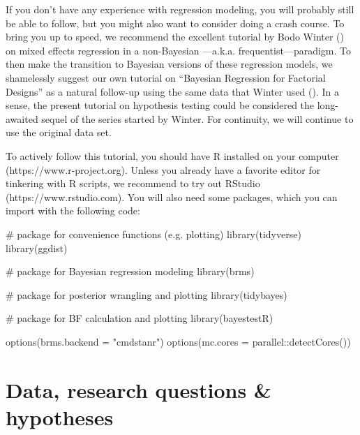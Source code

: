\documentclass[
  doc,
  floatsintext,
  longtable,
  nolmodern,
  notxfonts,
  notimes,
  colorlinks=true,linkcolor=blue,citecolor=blue,urlcolor=blue]{apa7}
\newenvironment{Shaded}{\begin{snugshade}}{\end{snugshade}}
\newcommand{\AttributeTok}[1]{\textcolor[rgb]{0.40,0.45,0.13}{#1}}
\newcommand{\CommentTok}[1]{\textcolor[rgb]{0.37,0.37,0.37}{#1}}
\newcommand{\FunctionTok}[1]{\textcolor[rgb]{0.28,0.35,0.67}{#1}}
\newcommand{\NormalTok}[1]{\textcolor[rgb]{0.00,0.23,0.31}{#1}}
\newcommand{\SpecialCharTok}[1]{\textcolor[rgb]{0.37,0.37,0.37}{#1}}
\newcommand{\StringTok}[1]{\textcolor[rgb]{0.13,0.47,0.30}{#1}}
\begin{document}
If you don't have any experience with regression modeling, you will
probably still be able to follow, but you might also want to consider
doing a crash course. To bring you up to speed, we recommend the
excellent tutorial by Bodo Winter
() on mixed eﬀects
regression in a non-Bayesian ---a.k.a. frequentist---paradigm. To then
make the transition to Bayesian versions of these regression models, we
shamelessly suggest our own tutorial on ``Bayesian Regression for
Factorial Designs'' as a natural follow-up using the same data that
Winter used
(). In a sense, the present tutorial on hypothesis testing
could be considered the long-awaited sequel of the series started by
Winter. For continuity, we will continue to use the original data set.

To actively follow this tutorial, you should have R installed on your
computer (https://www.r-project.org). Unless you already have a favorite
editor for tinkering with R scripts, we recommend to try out RStudio
(https://www.rstudio.com). You will also need some packages, which you
can import with the following code:

\begin{Shaded}
\begin{Highlighting}[]
\CommentTok{\# package for convenience functions (e.g. plotting)}
\FunctionTok{library}\NormalTok{(tidyverse)}
\FunctionTok{library}\NormalTok{(ggdist)}

\CommentTok{\# package for Bayesian regression modeling}
\FunctionTok{library}\NormalTok{(brms)}

\CommentTok{\# package for posterior wrangling and plotting}
\FunctionTok{library}\NormalTok{(tidybayes)}

\CommentTok{\# package for BF calculation and plotting}
\FunctionTok{library}\NormalTok{(bayestestR)}

\FunctionTok{options}\NormalTok{(}\AttributeTok{brms.backend =} \StringTok{"cmdstanr"}\NormalTok{)}
\FunctionTok{options}\NormalTok{(}\AttributeTok{mc.cores =}\NormalTok{ parallel}\SpecialCharTok{::}\FunctionTok{detectCores}\NormalTok{())}
\end{Highlighting}
\end{Shaded}

\section{Data, research questions \&
hypotheses}\label{data-research-questions-hypotheses}
\end{document}
